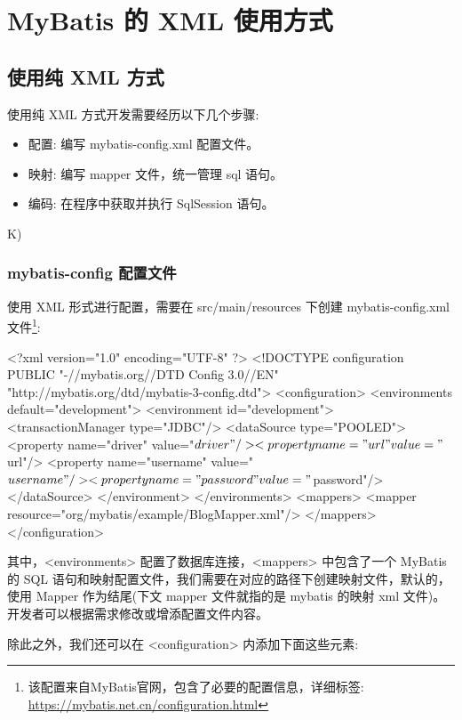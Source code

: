 \section{MyBatis 的 XML 使用方式}

\subsection{使用纯 XML 方式}

使用纯 XML 方式开发需要经历以下几个步骤:
\begin{itemize}
    \item 配置: 编写 mybatis-config.xml 配置文件。
    \item 映射: 编写 mapper 文件，统一管理 sql 语句。
    \item 编码: 在程序中获取并执行 SqlSession 语句。
\end{itemize}
K)
\subsubsection*{mybatis-config 配置文件}

使用 XML 形式进行配置，需要在 src/main/resources 下创建 mybatis-config.xml 文件\footnote{该配置来自MyBatis官网，包含了必要的配置信息，详细标签: \url{https://mybatis.net.cn/configuration.html}}:

\begin{xml}
<?xml version="1.0" encoding="UTF-8" ?>
<!DOCTYPE configuration
        PUBLIC "-//mybatis.org//DTD Config 3.0//EN"
        "http://mybatis.org/dtd/mybatis-3-config.dtd">
<configuration>
    <environments default="development">
        <environment id="development">
            <transactionManager type="JDBC"/>
            <dataSource type="POOLED">
                <property name="driver" value="${driver}"/>
                <property name="url" value="${url}"/>
                <property name="username" value="${username}"/>
                <property name="password" value="${password}"/>
            </dataSource>
        </environment>
    </environments>
    <mappers>
        <mapper resource="org/mybatis/example/BlogMapper.xml"/>
    </mappers>
</configuration>
\end{xml}

其中，<environments> 配置了数据库连接，<mappers> 中包含了一个 MyBatis 的 SQL 语句和映射配置文件，我们需要在对应的路径下创建映射文件，默认的，使用 Mapper 作为结尾(下文 mapper 文件就指的是 mybatis 的映射 xml 文件)。开发者可以根据需求修改或增添配置文件内容。

除此之外，我们还可以在 <configuration> 内添加下面这些元素:

